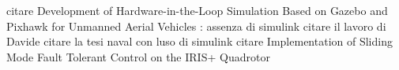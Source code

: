\begin{commento}
citare Development of Hardware-in-the-Loop Simulation Based on Gazebo
	and Pixhawk for Unmanned Aerial Vehicles : assenza di simulink
citare il lavoro di Davide
citare la tesi naval con luso di simulink
citare Implementation of Sliding Mode Fault Tolerant Control on the IRIS+
Quadrotor
\end{commento}

\begin{idee}

%



%


\end{idee}
